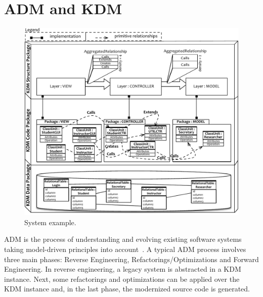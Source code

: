 
\section{ADM and KDM} %
\label{sec:background}
 
\begin{figure}[t]
	\centering
	\includegraphics[scale=0.8]{figuras/NovoSystem3}
	\caption{System example.}
	\label{fig:system}
\end{figure}

ADM is the process of understanding  and evolving existing software systems taking model-driven principles into account~\cite{1686216}. A typical ADM process involves three main phases: Reverse Engineering, Refactorings/Optimizations and Forward Engineering. In reverse engineering, a legacy system is abstracted in a KDM instance. Next, some refactorings and optimizations can be applied over the KDM instance and, in the last phase, the modernized source code is generated.

